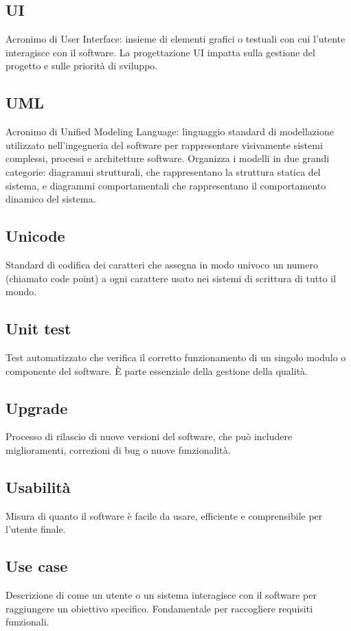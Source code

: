 \documentclass[a4paper,12pt]{article}
\begin{document}
          \subsection*{UI}
			Acronimo di User Interface: insieme di elementi grafici o testuali con cui l'utente interagisce con il software. La progettazione UI impatta sulla gestione del progetto e sulle priorità di sviluppo.
          \subsection*{UML}
			Acronimo di Unified Modeling Language: linguaggio standard di modellazione utilizzato nell'ingegneria del software per rappresentare visivamente sistemi complessi, processi e architetture software. Organizza i modelli in due grandi categorie: diagrammi strutturali, che rappresentano la struttura statica del sistema, e diagrammi comportamentali che rappresentano il comportamento dinamico del sistema.
          \subsection*{Unicode}
			Standard di codifica dei caratteri che assegna in modo univoco un numero (chiamato code point) a ogni carattere usato nei sistemi di scrittura di tutto il mondo.
          \subsection*{Unit test}
			Test automatizzato che verifica il corretto funzionamento di un singolo modulo o componente del software. È parte essenziale della gestione della qualità.
          \subsection*{Upgrade}
			Processo di rilascio di nuove versioni del software, che può includere miglioramenti, correzioni di bug o nuove funzionalità.
          \subsection*{Usabilità}
			Misura di quanto il software è facile da usare, efficiente e comprensibile per l'utente finale.
          \subsection*{Use case}
			Descrizione di come un utente o un sistema interagisce con il software per raggiungere un obiettivo specifico. Fondamentale per raccogliere requisiti funzionali.
\end{document}
